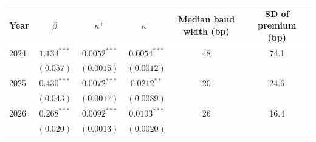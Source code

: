 \begin{tabular}{lccccc}
\toprule
 Year & $\beta$ & $\kappa^+$ & $\kappa^-$ & Median band width (bp) & SD of premium (bp) \\
\midrule
2024 & $1.134^{***}$ & $0.0052^{***}$ & $0.0054^{***}$ & 48 & 74.1 \\
 & $(0.057)$ & $(0.0015)$ & $(0.0012)$ & & \\
2025 & $0.430^{***}$ & $0.0072^{***}$ & $0.0212^{**}$ & 20 & 24.6 \\
 & $(0.043)$ & $(0.0017)$ & $(0.0089)$ & & \\
2026 & $0.268^{***}$ & $0.0092^{***}$ & $0.0103^{***}$ & 26 & 16.4 \\
 & $(0.020)$ & $(0.0013)$ & $(0.0020)$ & & \\
\bottomrule
\end{tabular}
